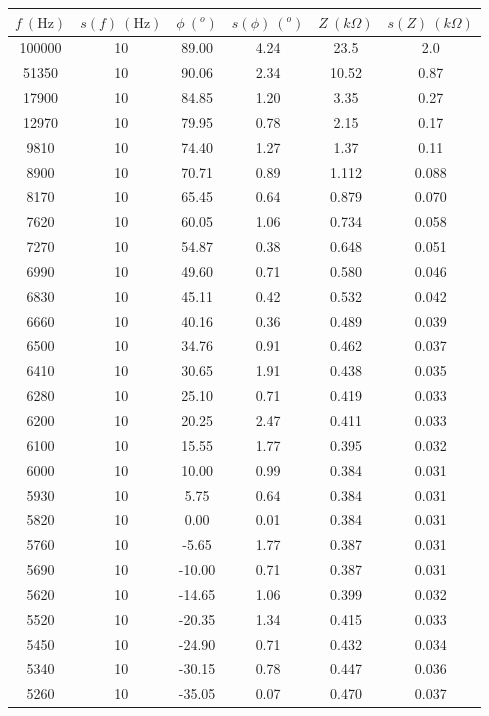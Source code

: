 \documentclass[12pt,a4paper]{article}
\newcommand{\Hz}{\mathrm{Hz} }
\begin{document}
\begin{table}[h!] 	 \centering 
\begin{tabular}{|c|c|c|c|c|c|} 
\hline 
$f  \ (\Hz) $  & $s(f) \ (\Hz)$ & $ \phi \ (^o)$ & $s(\phi) \ (^o)$ & $Z \ (k \Omega)  $ &  $s(Z) \ (k \Omega)$ \\ \hline 
100000  & 10 &  89.00 & 4.24 & 23.5 & 2.0 \\ 
51350  & 10 &  90.06 & 2.34 & 10.52 & 0.87 \\ 
17900  & 10 &  84.85 & 1.20 & 3.35 & 0.27 \\ 
12970  & 10 &  79.95 & 0.78 & 2.15 & 0.17 \\ 
9810  & 10 &  74.40 & 1.27 & 1.37 & 0.11 \\ 
8900  & 10 &  70.71 & 0.89 & 1.112 & 0.088 \\ 
8170  & 10 &  65.45 & 0.64 & 0.879 & 0.070 \\ 
7620  & 10 &  60.05 & 1.06 & 0.734 & 0.058 \\ 
7270  & 10 &  54.87 & 0.38 & 0.648 & 0.051 \\ 
6990  & 10 &  49.60 & 0.71 & 0.580 & 0.046 \\ 
6830  & 10 &  45.11 & 0.42 & 0.532 & 0.042 \\ 
6660  & 10 &  40.16 & 0.36 & 0.489 & 0.039 \\ 
6500  & 10 &  34.76 & 0.91 & 0.462 & 0.037 \\ 
6410  & 10 &  30.65 & 1.91 & 0.438 & 0.035 \\ 
6280  & 10 &  25.10 & 0.71 & 0.419 & 0.033 \\ 
6200  & 10 &  20.25 & 2.47 & 0.411 & 0.033 \\ 
6100  & 10 &  15.55 & 1.77 & 0.395 & 0.032 \\ 
6000  & 10 &  10.00 & 0.99 & 0.384 & 0.031 \\ 
5930  & 10 &  5.75 & 0.64 & 0.384 & 0.031 \\ 
5820  & 10 &  0.00 & 0.01 & 0.384 & 0.031 \\ 
5760  & 10 &  -5.65 & 1.77 & 0.387 & 0.031 \\ 
5690  & 10 &  -10.00 & 0.71 & 0.387 & 0.031 \\ 
5620  & 10 &  -14.65 & 1.06 & 0.399 & 0.032 \\ 
5520  & 10 &  -20.35 & 1.34 & 0.415 & 0.033 \\ 
5450  & 10 &  -24.90 & 0.71 & 0.432 & 0.034 \\ 
5340  & 10 &  -30.15 & 0.78 & 0.447 & 0.036 \\ 
5260  & 10 &  -35.05 & 0.07 & 0.470 & 0.037 \\ 

\end{tabular}
\end{table}
\end{document}
